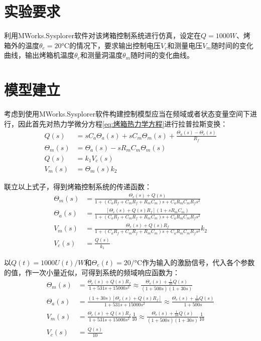 \documentclass[11pt]{article}
\begin{document}
\section{实验要求}
利用MWorks.Sysplorer软件对该烤箱控制系统进行仿真，设定在$Q=1000\unit{W}$、烤箱外的温度$\theta_e=20\unit{\celsius}$的情况下，要求输出控制电压$V_c$和测量电压$V_m$随时间的变化曲线，输出烤箱机温度$\theta_e$和测量洞温度$\theta_m$随时间的变化曲线。
\section{模型建立}
考虑到使用MWorks.Sysplorer软件构建控制模型应当在频域或者状态变量空间下进行，因此首先对热力学微分方程\ref{eq:烤箱热力学方程}进行拉普拉斯变换：
\begin{align*}
  Q(s)        & =sC_a\Theta_a(s)+sC_m\Theta_m(s)+\frac{\Theta_a(s)-\Theta_e(s)}{R_f} \\
  \Theta_m(s) & =\Theta_a(s)-sR_mC_m\Theta_m(s)                                      \\
  Q(s)        & =k_1V_c(s)                                                           \\
  V_m(s)      & =\Theta_m(s)k_2
  \label{eq:烤箱热力学方程拉普拉斯}
\end{align*}\par
联立以上式子，得到烤箱控制系统的传递函数：
\begin{align*}
  \Theta_m(s) & =\frac{\Theta_e(s)+Q(s)}{1+(C_aR_f+C_mR_f+R_mC_m)s+C_aR_mC_mR_fs^2}              \\
  \Theta_a(s) & =\frac{[\Theta_e(s)+Q(s)R_f](1+sR_mC_m)}{1+(C_aR_f+C_mR_f+R_mC_m)s+C_aR_mC_mR_fs^2} \\
  V_m(s)      & =\frac{\Theta_e(s)+Q(s)R_f}{1+(C_aR_f+C_mR_f+R_mC_m)s+C_aR_mC_mR_fs^2}k_2           \\
  V_c(s)      & =\frac{Q(s)}{k_1}
\end{align*}\par
以$Q(t)=1000U(t)/\unit{W}$和$\Theta_e(t)=20/\unit{\celsius}$作为输入的激励信号，代入各个参数的值，作一次小量近似，可得到系统的频域响应函数为：
\begin{align*}
  \Theta_m(s) & =\frac{\Theta_e(s)+Q(s)R_f}{1+531s+15000s^2}\approx\frac{\Theta_e(s)+\frac{1}{10}Q(s)}{(1+500s)(1+30s)} \\
  \Theta_a(s) & =\frac{(1+30s)[\Theta_e(s)+Q(s)R_f]}{1+531s+15000s^2}\approx\frac{\Theta_e(s)+\frac{1}{10}Q(s)}{1+500s}     \\
  V_m(s)      & =\frac{\Theta_e(s)+Q(s)R_f}{1+531s+15000s^2}\frac{1}{10}   \approx\frac{\Theta_e(s)+\frac{1}{10}Q(s)}{(1+500s)(1+30s)}\frac{1}{10} \\
  V_c(s)      & =\frac{Q(s)}{10}
\end{align*}\par
\end{document}
